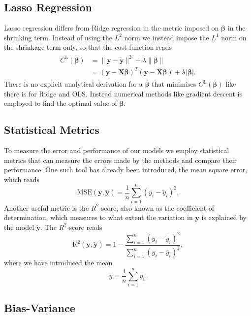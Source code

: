\documentclass[a4paper, 
amsfonts, 
amssymb, 
amsmath, 
reprint, 
showkeys, 
nofootinbib, 
twoside]{revtex4-2}
\begin{document}
\subsection{Lasso Regression}
Lasso regression differs from Ridge regression in the metric imposed on $\bm{\beta}$ in the shrinking term. Instead of using the $L^2$ norm we instead impose the $L^1$ norm on the shrinkage term only, so that the cost function reads
\begin{align}
\begin{split}
        C^{\textrm{L}}(\bm{\beta}) &= \lVert \bm{y} - \bm{\tilde{y}}\rVert^2 + \lambda \lVert \bm{\beta}\rVert \\
        &= (\bm{y} - \bm{X\beta})^T(\bm{y} - \bm{X\beta}) + \lambda \lvert \bm{\beta} \rvert.
\end{split}
\end{align}
There is no explicit analytical derivation for a $\bm{\beta}$ that minimises $C^{\textrm{L}}(\bm{\beta})$ like there is for Ridge and OLS. Instead numerical methods like gradient descent is employed to find the optimal value of $\bm{\beta}$.

\subsection{Statistical Metrics}

To measure the error and performance of our models we employ statistical metrics that can measure the errors made by the methods and compare their performance. 
One such tool has already been introduced, the mean square error, which reads
\begin{equation}
    \textrm{MSE}(\bm{y}, \bm{\tilde{y}}) = \frac{1}{n}\sum_{i = 1}^n (y_i - \tilde{y}_i)^2.
\end{equation}
Another useful metric is the $R^2$-score, also known as the coefficient of determination, which measures to what extent the variation in $\bm{y}$ is explained by the model $\bm{\tilde{y}}$. The $R^2$-score reads
\begin{equation}
    \textrm{R}^2(\bm{y}, \bm{\tilde{y}}) = 1 - \frac{\sum_{i = 1}^n (y_i - \tilde{y}_i)^2}{\sum_{i = 1}^n (y_i - \bar{y}_i)^2},
\end{equation}
where we have introduced the mean
\begin{equation}
    \bar{y} = \frac{1}{n}\sum_{i = 1}^n y_i.
\end{equation}

\subsection{Bias-Variance}
\end{document}
